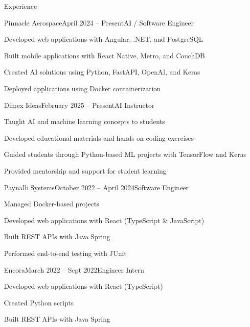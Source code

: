 \begin{rSection}{Experience}

    \begin{rSubsection}{Pinnacle Aerospace}{April 2024 -- Present}{AI / Software Engineer}{}
        \item Developed web applications with Angular, .NET, and PostgreSQL
        \item Built mobile applications with React Native, Metro, and CouchDB
        \item Created AI solutions using Python, FastAPI, OpenAI, and Keras
        \item Deployed applications using Docker containerization
    \end{rSubsection}

    \begin{rSubsection}{Dimex Ideas}{February 2025 -- Present}{AI Instructor}{}
        \item Taught AI and machine learning concepts to students
        \item Developed educational materials and hands-on coding exercises
        \item Guided students through Python-based ML projects with TensorFlow and Keras
        \item Provided mentorship and support for student learning
    \end{rSubsection}

    \begin{rSubsection}{Paynalli Systems}{October 2022 -- April 2024}{Software Engineer}{}
        \item Managed Docker-based projects
        \item Developed web applications with React (TypeScript \& JavaScript)
        \item Built REST APIs with Java Spring
        \item Performed end-to-end testing with JUnit
    \end{rSubsection}

    \begin{rSubsection}{Encora}{March 2022 -- Sept 2022}{Engineer Intern}{}
        \item Developed web applications with React (TypeScript)
        \item Created Python scripts
        \item Built REST APIs with Java Spring
    \end{rSubsection}

\end{rSection}
